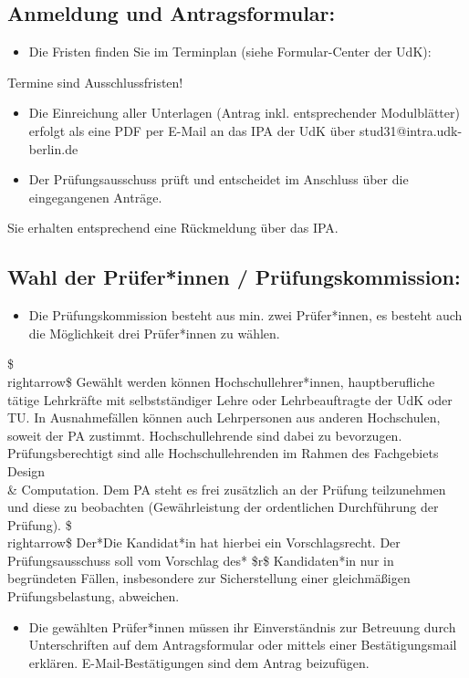 \documentclass{article}%
\begin{document}
\subsection*{Anmeldung und Antragsformular:}
%
\begin{itemize}
\item Die Fristen finden Sie im Terminplan (siehe Formular-Center der UdK):
\end{itemize}
%
Termine sind Ausschlussfristen!
%
\begin{itemize}
\item Die Einreichung aller Unterlagen (Antrag inkl. entsprechender Modulblätter) erfolgt als eine PDF per E-Mail an das IPA der UdK über stud31@intra.udk-berlin.de
\item Der Prüfungsausschuss prüft und entscheidet im Anschluss über die eingegangenen Anträge.
\end{itemize}
%
Sie erhalten entsprechend eine Rückmeldung über das IPA.
%
\subsection*{Wahl der Prüfer*innen / Prüfungskommission:}
%
\begin{itemize}
\item Die Prüfungskommission besteht aus min. zwei Prüfer*innen, es besteht auch die Möglichkeit drei Prüfer*innen zu wählen.
\end{itemize}
\$\\rightarrow\$ Gewählt werden können Hochschullehrer*innen, hauptberufliche tätige Lehrkräfte mit selbstständiger Lehre oder Lehrbeauftragte der UdK oder TU. In Ausnahmefällen können auch Lehrpersonen aus anderen Hochschulen, soweit der PA zustimmt. Hochschullehrende sind dabei zu bevorzugen. Prüfungsberechtigt sind alle Hochschullehrenden im Rahmen des Fachgebiets Design \\\& Computation.
Dem PA steht es frei zusätzlich an der Prüfung teilzunehmen und diese zu beobachten (Gewährleistung der ordentlichen Durchführung der Prüfung).
\$\\rightarrow\$ Der*Die Kandidat*in hat hierbei ein Vorschlagsrecht. Der Prüfungsausschuss soll vom Vorschlag des* \$r\$ Kandidaten*in nur in begründeten Fällen, insbesondere zur Sicherstellung einer gleichmäßigen Prüfungsbelastung, abweichen.
\begin{itemize}
\item Die gewählten Prüfer*innen müssen ihr Einverständnis zur Betreuung durch Unterschriften auf dem Antragsformular oder mittels einer Bestätigungsmail erklären. E-Mail-Bestätigungen sind dem Antrag beizufügen.
\end{itemize}
%
\end{document}
